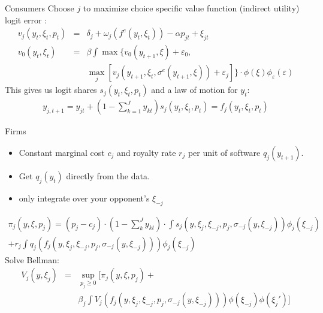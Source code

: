 \documentclass[xcolor=pdftex,dvipsnames,table,mathserif,aspectratio=169]{beamer}
\begin{document}
\begin{frame}{Consumers}
Choose $j$ to maximize choice specific value function (indirect utility) logit error :
\begin{eqnarray*}
v_j (y_t,\xi_t,p_t) &=& \delta_j + \omega_j( f^e(y_t,\xi_t)) - \alpha p_{jt} + \xi_{jt}\\
v_0(y_t,\xi_t) &=& \beta \int \max\{ v_0(y_{t+1},\xi) + \varepsilon_0, \\
&&  \max_j [v_j (y_{t+1},\xi_t,\sigma^e(y_{t+1},\xi)) + \varepsilon_j ] \} \cdot \phi(\xi) \phi_{\varepsilon}(\varepsilon)
\end{eqnarray*}
This gives us logit shares $s_j(y_{t},\xi_{t},p_t)$ and a law of motion for $y_{t}$:
\begin{eqnarray*}
y_{j,t+1} = y_{jt} + (1-\sum_{k=1}^J y_{kt}) s_j(y_t,\xi_t, p_t) = f_j (y_t, \xi_t, p_t)
\end{eqnarray*}
\end{frame}


\begin{frame}{Firms}
\begin{itemize}
\item Constant marginal cost $c_j$ and royalty rate $r_j$ per unit of software $q_j(y_{t+1})$.
\item Get $q_j(y_t)$ directly from the data.
\item only integrate over your opponent's $\xi_{-j}$
\end{itemize}
\small
\begin{eqnarray*} \pi_j(y,\xi,p_j) = (p_j - c_j) \cdot (1-\sum_k^{J} y_{kt}) \cdot \int s_j(y,\xi_j,\xi_{-j},p_j,\sigma_{-j}(y,\xi_{-j})) \phi_j(\xi_{-j}) \\
+ r_j \int q_j(f_j(y,\xi_j,\xi_{-j},p_j,\sigma_{-j}(y,\xi_{-j}))) \phi_j(\xi_{-j})
\end{eqnarray*}
Solve Bellman:
\begin{eqnarray*} 
V_j(y,\xi_j) &=& \sup_{p_j \geq 0} [ \pi_j(y,\xi,p_j) +\\
 && \beta_f \int V_j(f_j(y,\xi_j,\xi_{-j},p_j,\sigma_{-j}(y,\xi_{-j}))) \phi(\xi_{-j}) \phi(\xi_j')]
\end{eqnarray*}


\end{frame}
\end{document}
